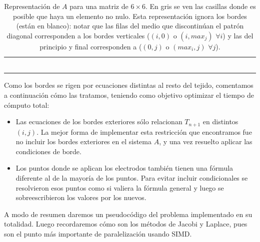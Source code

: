 \documentclass[a4paper]{article}
\begin{document}
\begin{table}[!htbp]
\begin{tabular}{|l|l|l|l|l|l|l|l|l|l|l|l|l|l|l|l|l|l|l|l|l|l|l|l|l|l|l|l|l|l|l|l|l|l|l|l|}
 & & & & & & & & & & & & & & & & & & & & & & & & & & & & & & & & & & & \\ \hline 
 & & & & & & & & & & & & & & & & & & & & & & & & & & & & & & & & & & & \\ \hline 
 & & & & & & & & & & & & & & & & & & & & & & & & & & & & & & & & & & & \\ \hline 
 & & & & & & & & & & & & & & & & & & & & & & & & & & & & & & & & & & & \\ \hline 
 & & & & & & & & & & & & & & & & & & & & & & & & & & & & & & & & & & & \\ \hline 
 & & & & & & & & & & & & & & & & & & & & & & & & & & & & & & & & & & & \\ \hline 
 & & & & & & & & & & & & & & & & & & & & & & & & & & & & & & & & & & & \\ \hline
\end{tabular}
\caption{Representación de $A$ para una matriz de $6\times6$. En gris se ven las casillas donde es posible que haya un elemento no nulo. Esta representación ignora los bordes (están en blanco): notar que las filas del medio que discontinúan el patrón diagonal corresponden a los bordes verticales ($(i,0)$ o $(i,max_j)$ $\forall i$) y las del principio y final corresponden a ($(0,j)$ o $(max_i,j)$ $\forall j$). }
\end{table}

Como los bordes se rigen por ecuaciones distintas al resto del tejido, comentamos a continuación
cómo las tratamos, teniendo como objetivo optimizar el tiempo de cómputo total:
\begin{itemize}
\item Las ecuaciones de los bordes exteriores sólo
relacionan $T_{n+1}$ en distintos $(i,j)$. La mejor forma de implementar esta
restricción que encontramos fue no incluir los bordes exteriores en el sistema $A$, y una vez
resuelto aplicar las condiciones de borde.
\item Los puntos donde se aplican los electrodos también tienen una 
fórmula diferente al de la mayoría de los puntos. Para evitar incluir 
condicionales se resolvieron esos puntos como si valiera la fórmula general
y luego se sobreescribieron los valores por los nuevos.
\end{itemize}

A modo de resumen daremos un pseudocódigo del problema implementado en su totalidad. Luego recordaremos cómo son los métodos de Jacobi y Laplace, pues son el punto más importante de paralelización usando SIMD.
\end{document}
